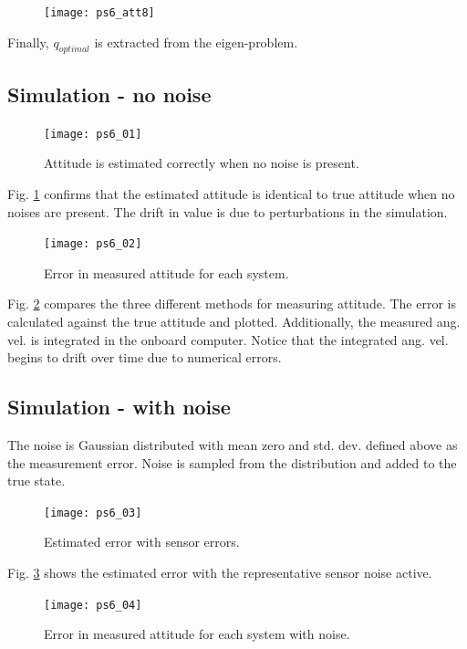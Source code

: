 \documentclass[12pt, letterpaper]{article}
\begin{document}
\begin{figure}[H]
	\centering
	\texttt{[image: ps6\_att8]}
\end{figure}

Finally, $q_{optimal}$ is extracted from the eigen-problem.

\subsection{Simulation - no noise}

\begin{figure}[H]
	\centering
	\texttt{[image: ps6\_01]}
	\caption{Attitude is estimated correctly when no noise is present.}
	\label{6:01}
\end{figure}

Fig. \ref{6:01} confirms that the estimated attitude is identical to true attitude when no noises are present. The drift in value is due to perturbations in the simulation.

\begin{figure}[H]
	\centering
	\texttt{[image: ps6\_02]}
	\caption{Error in measured attitude for each system.}
	\label{6:02}
\end{figure}

Fig. \ref{6:02} compares the three different methods for measuring attitude. The error is calculated against the true attitude and plotted. Additionally, the measured ang. vel. is integrated in the onboard computer. Notice that the integrated ang. vel. begins to drift over time due to numerical errors.

\subsection{Simulation - with noise}

The noise is Gaussian distributed with mean zero and std. dev. defined above as the measurement error. Noise is sampled from the distribution and added to the true state.

\begin{figure}[H]
	\centering
	\texttt{[image: ps6\_03]}
	\caption{Estimated error with sensor errors.}
	\label{6:03}
\end{figure}

Fig. \ref{6:03} shows the estimated error with the representative sensor noise active.

\begin{figure}[H]
	\centering
	\texttt{[image: ps6\_04]}
	\caption{Error in measured attitude for each system with noise.}
	\label{6:04}
\end{figure}
\end{document}
